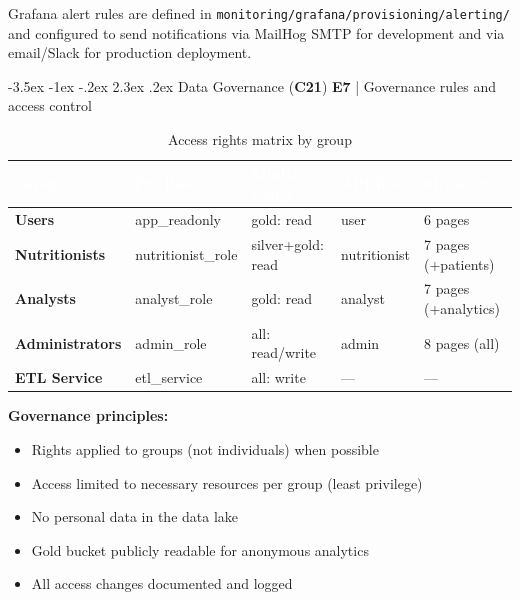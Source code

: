 \documentclass[a4paper,11pt,oneside,openany]{report}
\makeatletter
\renewcommand\section{\@startsection{section}{1}{\z@}%
  {-3.5ex \@plus -1ex \@minus -.2ex}%
  {2.3ex \@plus.2ex}%
  {\normalfont\Large\bfseries\color{ntgreen}}}
\newcommand{\competence}[1]{\textbf{\textcolor{ntgreen}{#1}}}
\newcommand{\evaluation}[1]{\textbf{\textcolor{ntblue}{#1}}}
\makeatother
\begin{document}
Grafana alert rules are defined in \texttt{monitoring/grafana/provisioning/alerting/}
and configured to send notifications via MailHog SMTP for development
and via email/Slack for production deployment.


\section{Data Governance (\competence{C21})}
\label{sec:c21}
{\small\evaluation{E7} | Governance rules and access control}

\begin{table}[H]
\centering
\caption{Access rights matrix by group}
\label{tab:access-matrix}
\begin{tabularx}{\textwidth}{L{2.3cm} L{2.3cm} L{3.2cm} C{1.5cm} L{3.2cm}}
\toprule
{}
\textcolor{white}{\textbf{Group}} & \textcolor{white}{\textbf{PG Role}} & \textcolor{white}{\textbf{MinIO Policy}} & \textcolor{white}{\textbf{API Role}} & \textcolor{white}{\textbf{Streamlit}} \\
\midrule
\textbf{Users} & app\_readonly & gold: read & user & 6 pages \\
\textbf{Nutritionists} & nutritionist\_role & silver+gold: read & nutritionist & 7 pages (+patients) \\
\textbf{Analysts} & analyst\_role & gold: read & analyst & 7 pages (+analytics) \\
\textbf{Administrators} & admin\_role & all: read/write & admin & 8 pages (all) \\
\textbf{ETL Service} & etl\_service & all: write & --- & --- \\
\bottomrule
\end{tabularx}
\end{table}

\textbf{Governance principles:}
\begin{itemize}[nosep]
  \item Rights applied to groups (not individuals) when possible
  \item Access limited to necessary resources per group (least privilege)
  \item No personal data in the data lake
  \item Gold bucket publicly readable for anonymous analytics
  \item All access changes documented and logged
\end{itemize}
\end{document}
